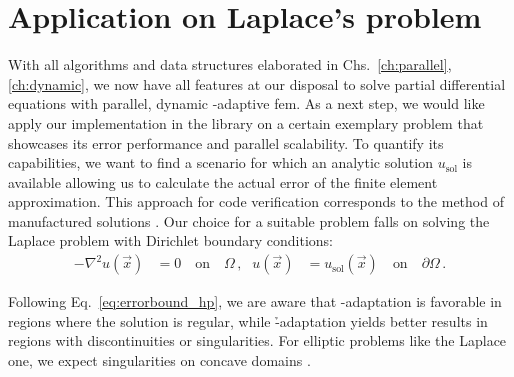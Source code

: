 \chapter{Application on Laplace's problem}
\label{ch:results}
\glsresetall


With all algorithms and data structures elaborated in Chs.~\ref{ch:parallel}, \ref{ch:dynamic}, we now have all features at our disposal to solve partial differential equations with parallel, dynamic \hp-adaptive \gls{fem}. As a next step, we would like apply our implementation in the \dealii{} library on a certain exemplary problem that showcases its error performance and parallel scalability. To quantify its capabilities, we want to find a scenario for which an analytic solution $u_\text{sol}$ is available allowing us to calculate the actual error of the finite element approximation. This approach for code verification corresponds to the method of manufactured solutions \parencite{salari2000}. Our choice for a suitable problem falls on solving the Laplace problem with Dirichlet boundary conditions:
\begin{align}
- \nabla^2 u(\vec{x}) &= 0 \quad\text{on}\quad \Omega \,\text{,} & u(\vec{x}) &= u_\text{sol}(\vec{x}) \quad\text{on}\quad \partial\Omega \,\text{.}
\end{align}

Following Eq.~\ref{eq:errorbound_hp}, we are aware that \p-adaptation is favorable in regions where the solution is regular, while \h-adaptation yields better results in regions with discontinuities or singularities. For elliptic problems like the Laplace one, we expect singularities on concave domains \parencite[Sec.~5.5]{brenner2008}.

